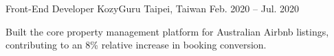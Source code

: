 \resumeExperience
  {Front-End Developer}
  {KozyGuru}
  {Taipei, Taiwan}
  {Feb. 2020 -- Jul. 2020}
  {
    \item Built the core property management platform for Australian Airbnb listings, contributing to an 8\% relative increase in booking conversion.
  }
